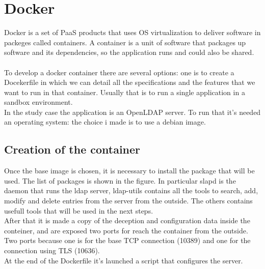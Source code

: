 \chapter{Docker}
Docker is a set of PaaS products that uses OS virtualization to deliver software in packeges called containers. A container is a unit of software that packages up software and its dependencies, so the application runs and could also be shared. 
\\\\
To develop a docker container there are several options: one is to create a Docekerfile in which we can detail all the specifications and the features that we want to run in that container. Usually that is to run a single application in a sandbox environment.  
\\
In the study case the application is an OpenLDAP server. To run that it’s needed an operating system: the choice i made is to use a debian image.
\section{Creation of the container}
\begin{mdframed}[backgroundcolor=back]

\end{mdframed}
Once the base image is chosen, it is necessary to install the package that will be used. The list of packages is shown in the figure. In particular slapd is the daemon that runs the ldap server, ldap-utils contains all the tools to search, add, modify and delete entries from the server from the outside. The others contains usefull tools that will be used in the next steps.  
\\
After that it is made a copy of the deception and configuration data inside the conteiner, and are exposed two ports for reach the container from the outside. Two ports because one is for the base TCP connection (10389) and one for the connection using TLS (10636). 
\\
At the end of the Dockerfile it’s launched a script that configures the server.
